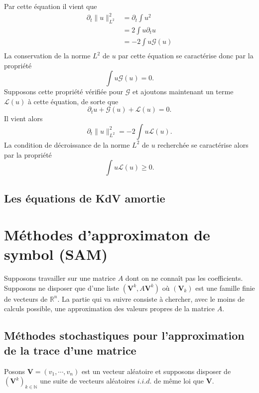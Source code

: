 \documentclass[12pt,a4paper]{article}
\numberwithin{equation}{section}
\begin{document}
Par cette équation il vient que
\begin{equation*}
    \begin{split}
        \partial_t\|u\|^2_{L^2}  &= \partial_t\int u^2\\
        &= 2\int u\partial_tu\\
        &= -2\int u\mathcal{G}(u)\\
    \end{split}
\end{equation*}
La conservation de la norme $L^2$ de $u$ par cette équation se caractérise donc par la propriété
\begin{equation}
    \int u\mathcal{G}(u) = 0.
\end{equation}
Supposons cette propriété vérifiée pour $\mathcal{G}$ et ajoutons maintenant un terme $\mathcal{L}(u)$ à cette équation, de sorte que 
\begin{equation*}
    \partial_t u + \mathcal{G}(u) + \mathcal{L}(u)= 0 .
\end{equation*}
Il vient alors
\begin{equation*}
     \partial_t\|u\|^2_{L^2}  = -2\int u\mathcal{L}(u).
\end{equation*}
La condition de décroissance de la norme $L^2$ de $u$ recherchée se caractérise alors par la propriété
\begin{equation}
    \int u\mathcal{L}(u) \geq 0.
\end{equation}
\subsection{Les équations de KdV amortie}

\section{Méthodes d'approximaton de symbol (SAM)}
Supposons travailler sur une matrice $A$ dont on ne connaît pas les coefficients. Supposons ne disposer que d'une liste $(\textbf{V}^k, A\textbf{V}^k)$ où $(\textbf{V}_k)$ est une famille finie de vecteurs de $\mathbb{R}^n$. La partie qui va suivre consiste à chercher, avec le moins de calculs possible, une approximation des valeurs propres de la matrice $A$.

\subsection{Méthodes stochastiques pour l'approximation de la trace d'une matrice}
Posons $\textbf{V}= (v_1,\cdots,v_n)$ est un vecteur aléatoire et supposons disposer de $(\textbf{V}^k)_{k\in\mathbb{N}}$ une suite de vecteurs aléatoires $i.i.d.$ de même loi que $\textbf{V}$.
\end{document}
